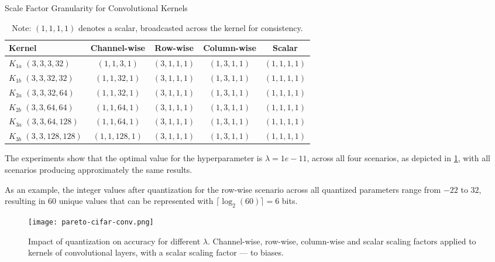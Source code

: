 \begin{table}[t!]
  \centering
  \scriptsize
  \caption{Scale Factor Granularity for Convolutional Kernels}
  \label{tab:scalefactorgranularityconv}
  \begin{tabular}{lcccc}
    \toprule
    \textbf{Kernel}                      & \textbf{Channel-wise} & \textbf{Row-wise} & \textbf{Column-wise} & \textbf{Scalar} \\ 
    \midrule
    \( K_{1a} \) \( (3, 3, 3, 32) \)     & \( (1, 1, 3, 1) \) & \( (3, 1, 1, 1) \) & \( (1, 3, 1, 1) \) & \( (1, 1, 1, 1) \) \\ 
    \( K_{1b} \) \( (3, 3, 32, 32) \)    & \( (1, 1, 32, 1) \) & \( (3, 1, 1, 1) \) & \( (1, 3, 1, 1) \) & \( (1, 1, 1, 1) \) \\ 
    \( K_{2a} \) \( (3, 3, 32, 64) \)    & \( (1, 1, 32, 1) \) & \( (3, 1, 1, 1) \) & \( (1, 3, 1, 1) \) & \( (1, 1, 1, 1) \) \\ 
    \( K_{2b} \) \( (3, 3, 64, 64) \)    & \( (1, 1, 64, 1) \) & \( (3, 1, 1, 1) \) & \( (1, 3, 1, 1) \) & \( (1, 1, 1, 1) \) \\ 
    \( K_{3a} \) \( (3, 3, 64, 128) \)   & \( (1, 1, 64, 1) \) & \( (3, 1, 1, 1) \) & \( (1, 3, 1, 1) \) & \( (1, 1, 1, 1) \) \\ 
    \( K_{3b} \) \( (3, 3, 128, 128) \)  & \( (1, 1, 128, 1) \) & \( (3, 1, 1, 1) \) & \( (1, 3, 1, 1) \) & \( (1, 1, 1, 1) \) \\ 
    \bottomrule
  \end{tabular}
  \vspace{0.5em}
  \caption*{\footnotesize Note: \( (1, 1, 1, 1) \) denotes a scalar, broadcasted across the kernel for consistency.}
\end{table}

The experiments show that the optimal value for the hyperparameter is \( \lambda = 1e-11\),
across all four scenarios, as depicted in \cref{fig:pareto-cifar-conv}, with 
all scenarios producing approximately the same results.

As an example, the integer values after quantization for the row-wise scenario across all quantized parameters range from \( -22 \) to \( 32 \), 
resulting in \( 60 \) unique values that can be represented with \( \lceil \log_2(60) \rceil = 6 \) bits.

\begin{figure}[b!]
  \centering
  \texttt{[image: pareto-cifar-conv.png]}
  \caption{Impact of quantization on accuracy for different \( \lambda \). Channel-wise, row-wise, column-wise and scalar scaling factors applied to kernels of convolutional layers, with a scalar scaling factor — to biases.}
  \label{fig:pareto-cifar-conv}
\end{figure}

